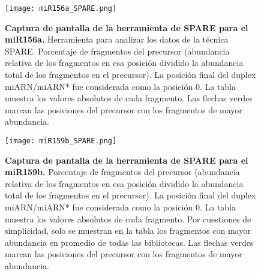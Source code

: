 \begin{landscape}
    \begin{figure}[htbp!] 
        \centering    
        \texttt{[image: miR156a\_SPARE.png]}
        \caption[Captura de pantalla de la herramienta de SPARE para el miR156a]{
        \textbf{Captura de pantalla de la herramienta de SPARE para el miR156a.}
        Herramienta para analizar los datos de la técnica SPARE.
        Porcentaje de fragmentos del precursor (abundancia relativa de los fragmentos en esa posición dividido la abundancia total de los fragmentos en el precursor).
        La posición final del duplex miARN/miARN* fue considerada como la posición 0.
        La tabla muestra los valores absolutos de cada fragmento.
        Las flechas verdes marcan las posiciones del precursor con los fragmentos de mayor abundancia. 
        }
         \label{fig:miR156a_SPARE}
    \end{figure}
\end{landscape}



\begin{landscape}
    \begin{figure}[htbp!] 
        \centering    
        \texttt{[image: miR159b\_SPARE.png]}
		\caption[Captura de pantalla de la herramienta de SPARE para el miR159b]{
        \textbf{Captura de pantalla de la herramienta de SPARE para el miR159b.}
        Porcentaje de fragmentos del precursor (abundancia relativa de los fragmentos en esa posición dividido la abundancia total de los fragmentos en el precursor).
        La posición final del duplex miARN/miARN* fue considerada como la posición 0.
        La tabla muestra los valores absolutos de cada fragmento.
        Por cuestiones de simplicidad, solo se muestran en la tabla los fragmentos con mayor abundancia en promedio de todas las bibliotecas.
        Las flechas verdes marcan las posiciones del precursor con los fragmentos de mayor abundancia.
        }
		\label{fig:miR159b_SPARE}
    \end{figure}
\end{landscape}







